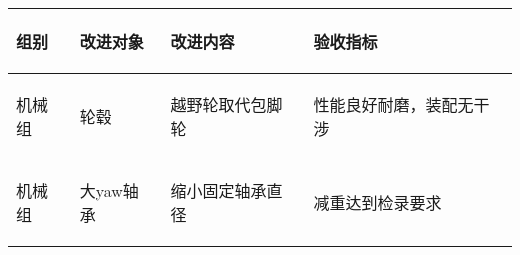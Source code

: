 
\begin{longtable}{ p{1.5cm} | p{3cm} | p{6cm} | p{4.3cm} |}

    \hline

    \endfoot
    
    \rowcolor{tabhdcolor}

        \begin{center}
            组别
        \end{center} &
        \begin{center}
            改进对象
        \end{center} &
        \begin{center}
            改进内容
        \end{center} &
        \begin{center}
            验收指标
        \end{center}\\

    \hline

    \endhead

        \begin{center}
            机械组
        \end{center} &
        \begin{center}
            轮毂
        \end{center} &
        \begin{center}
            越野轮取代包脚轮
        \end{center} &
        \begin{center}
            性能良好耐磨，装配无干涉
        \end{center}\\
        
    \hline
        \begin{center}
            机械组
        \end{center}&
        \begin{center}
            大yaw轴承
        \end{center}&
        \begin{center}
            缩小固定轴承直径
        \end{center}&
        \begin{center}
            减重达到检录要求
        \end{center}\\
        

\end{longtable}
